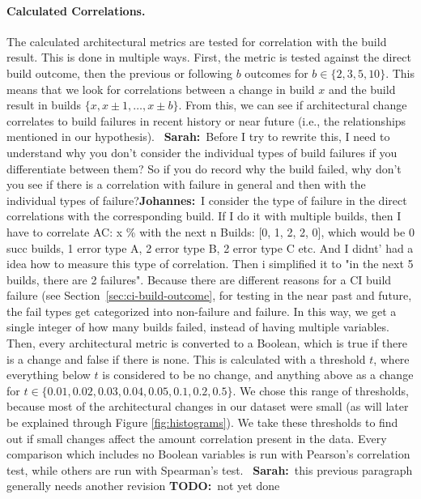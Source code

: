 \documentclass[sigplan, anonymous, review]{acmart}
\newcommand{\sn}[1]{{\color{blue}\textbf{Sarah:}~#1}}
\newcommand{\jk}[1]{{\color{violet}\textbf{Johannes:}~#1}}
\newcommand{\todo}[1]{{ \color{red} \textbf{TODO:}~#1}}
\begin{document}
\paragraph{Calculated Correlations.}

The calculated architectural metrics are tested for correlation with the build result. This is done in multiple ways. First, the metric is tested against the direct build outcome, then the previous or following $b$ outcomes for $b \in \{2, 3, 5, 10\}$. This means that we look for correlations between a change in build $x$ and the build result in builds $\{x, x \pm 1, \hdots, x \pm b\}$. From this, we can see if architectural change correlates to build failures in recent history or near future (i.e., the relationships mentioned in our hypothesis). 
~\sn{Before I try to rewrite this, I need to  understand why you don't consider the individual types of build failures if you differentiate between them? So if you do record why the build failed, why don't you see if there is a correlation with failure in general and then with the individual types of failure?}\jk{I consider the type of failure in the direct correlations with the corresponding build. If I do it with multiple builds, then I have to correlate AC: x \% with the next n Builds: [0, 1, 2, 2, 0], which would be 0 succ builds, 1 error type A, 2 error type B, 2 error type C etc. And I didnt' had a idea how to measure this type of correlation. Then i simplified it to "in the next 5 builds, there are 2 failures".} Because there are different reasons for a CI build failure (see Section~\ref{sec:ci-build-outcome}, for testing in the near past and future, the fail types get categorized into non-failure and failure. In this way, we get a single integer of how many builds failed, instead of having multiple variables. 
Then, every architectural metric is converted to a Boolean, which is true if there is a change and false if there is none. This is calculated with a threshold $t$, where everything below $t$ is considered to be no change, and anything above as a change for $t \in \{0.01, 0.02, 0.03, 0.04, 0.05, 0.1, 0.2, 0.5\}$. We chose this range of thresholds, because most of the architectural changes in our dataset were small (as will later be explained through Figure \ref{fig:histograms}). We take these thresholds to find out if small changes affect the amount correlation present in the data. Every comparison which includes no Boolean variables is run with Pearson's correlation test, while others are run with Spearman's test. ~\sn{this previous paragraph generally needs another revision} \todo{not yet done}
\end{document}
